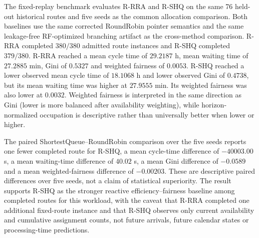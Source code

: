 The fixed-replay benchmark evaluates R-RRA and R-SHQ on the same 76 held-out
historical routes and five seeds as the common allocation comparison. Both
baselines use the same corrected RoundRobin pointer semantics and the same
leakage-free RF-optimized branching artifact as the cross-method comparison.
R-RRA completed $380/380$ admitted route instances and R-SHQ completed
$379/380$. R-RRA reached a mean cycle time of $29.2187$ h, mean waiting time of
$27.2885$ min, Gini of $0.5327$ and weighted fairness of $0.0053$. R-SHQ reached a lower observed mean
cycle time of $18.1068$ h and lower observed Gini of $0.4738$, but its mean
waiting time was higher at $27.9555$ min. Its weighted fairness was also lower
at $0.0032$. Weighted fairness is interpreted in the same direction as Gini
(lower is more balanced after availability weighting), while horizon-normalized
occupation is descriptive rather than universally better when lower or higher.

The paired ShortestQueue--RoundRobin comparison over the five seeds reports
one fewer completed route for R-SHQ, a mean cycle-time difference of
$-40003.00$ s, a mean waiting-time difference of $40.02$ s, a mean Gini
difference of $-0.0589$ and a mean weighted-fairness difference of $-0.00203$.
These are descriptive paired differences over five seeds, not a claim of
statistical superiority. The result supports R-SHQ as the stronger reactive
efficiency--fairness baseline among completed routes for this workload, with
the caveat that R-RRA completed one additional fixed-route instance and that
R-SHQ observes only current availability and cumulative assignment counts, not
future arrivals, future calendar states or processing-time predictions.
